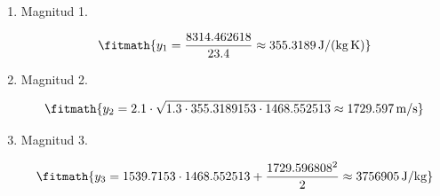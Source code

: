 \begin{enumerate}

\item Magnitud 1.

\[\fitmath{y_{1}=\frac{8314.462618}{23.4}\approx 355.3189\,\mathrm{J/(kg\,K)}}\]

\item Magnitud 2.

\[\fitmath{y_{2}=2.1\cdot \sqrt{1.3\cdot 355.3189153\cdot 1468.552513}\approx 1729.597\,\mathrm{m/s}}\]

\item Magnitud 3.

\[\fitmath{y_{3}=1539.7153\cdot 1468.552513+\frac{{1729.596808}^{2}}{2}\approx 3756905\,\mathrm{J/kg}}\]

\end{enumerate}
